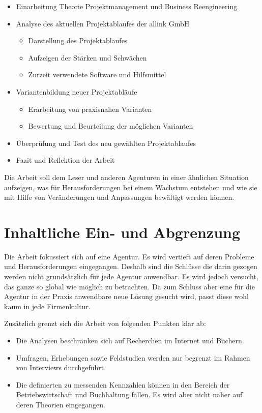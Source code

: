 \begin{itemize}
    \item Einarbeitung Theorie Projektmanagement und Business Reengineering
    \item Analyse des aktuellen Projektablaufes der allink GmbH
    \begin{itemize}
        \item Darstellung des Projektablaufes
        \item Aufzeigen der Stärken und Schwächen
        \item Zurzeit verwendete Software und Hilfsmittel
    \end{itemize}
    \item Variantenbildung neuer Projektabläufe
    \begin{itemize}
        \item Erarbeitung von praxisnahen Varianten
        \item Bewertung und Beurteilung der möglichen Varianten
    \end{itemize}
    \item Überprüfung und Test des neu gewählten Projektablaufes
    \item Fazit und Reflektion der Arbeit
\end{itemize}

Die Arbeit soll dem Leser und anderen Agenturen in einer ähnlichen Situation
aufzeigen, was für Herausforderungen bei einem Wachstum entstehen und wie
sie mit Hilfe von Veränderungen und Anpassungen bewältigt werden können.

\section{Inhaltliche Ein- und Abgrenzung}
Die Arbeit fokussiert sich auf eine Agentur. Es wird vertieft auf deren Probleme
und Herausforderungen eingegangen. Deshalb sind die Schlüsse die darin gezogen
werden nicht grundsätzlich für jede Agentur anwendbar. Es wird jedoch versucht, das
ganze so global wie möglich zu betrachten. Da zum Schluss aber eine für die
Agentur in der Praxis anwendbare neue Lösung gesucht wird, passt diese wohl
kaum in jede Firmenkultur.

Zusätzlich grenzt sich die Arbeit von folgenden Punkten klar ab:

\begin{itemize}
    \item Die Analysen beschränken sich auf Recherchen im Internet und Büchern.
    \item Umfragen, Erhebungen sowie Feldstudien werden nur begrenzt im Rahmen
        von Interviews durchgeführt.
    \item Die definierten zu messenden Kennzahlen können in den Bereich der Betriebswirtschaft
        und Buchhaltung fallen. Es wird aber nicht näher auf deren Theorien eingegangen.
\end{itemize}

